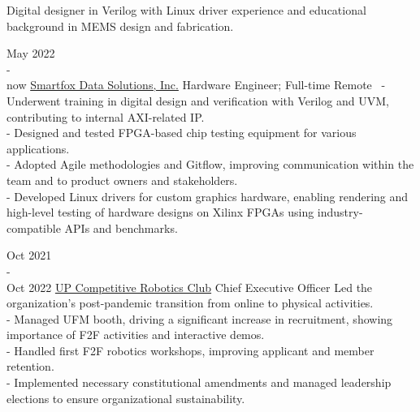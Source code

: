 \documentclass[9pt]{developercv}
\begin{document}
\begin{minipage}[t]{0.475\textwidth} 
	\vspace{-\baselineskip}

	Digital designer in Verilog with Linux driver experience and educational background in MEMS design and fabrication. \\


	\begin{entrylist}
		\entry
			{May 2022 \\ - \\ now}
			{\href{https://smartfoxdata.com}{Smartfox Data Solutions, Inc.}}
			{Hardware Engineer; Full-time Remote}
			{\
				- Underwent training in digital design and verification with Verilog and UVM, contributing to internal AXI-related IP. \\
				- Designed and tested FPGA-based chip testing equipment for various applications. \\
				- Adopted Agile methodologies and Gitflow, improving communication within the team and to product owners and stakeholders. \\
				- Developed Linux drivers for custom graphics hardware, enabling rendering and high-level testing of hardware designs on Xilinx FPGAs using industry-compatible APIs and benchmarks.
			}	
	\end{entrylist}
	\cvsect{Organizations}
	\begin{entrylist}
		\entry
			{Oct 2021 \\ - \\ Oct 2022}
			{\href{https://upcrc.org}{UP Competitive Robotics Club}}
			{Chief Executive Officer}
			{Led the organization's post-pandemic transition from online to physical activities.\\
			- Managed UFM booth, driving a significant increase in recruitment, showing importance of F2F activities and interactive demos.\\
			- Handled first F2F robotics workshops, improving applicant and member retention.\\
			- Implemented necessary constitutional amendments and managed leadership elections to ensure organizational sustainability.}
	\end{entrylist}


\end{minipage}
\end{document}
